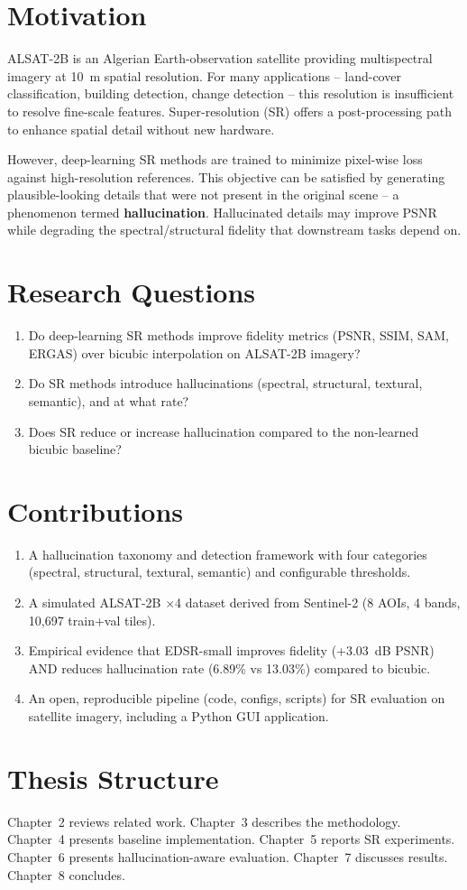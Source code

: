 \section{Motivation}
ALSAT-2B is an Algerian Earth-observation satellite providing multispectral imagery at 10~m spatial resolution. For many applications -- land-cover classification, building detection, change detection -- this resolution is insufficient to resolve fine-scale features. Super-resolution (SR) offers a post-processing path to enhance spatial detail without new hardware.

However, deep-learning SR methods are trained to minimize pixel-wise loss against high-resolution references. This objective can be satisfied by generating plausible-looking details that were not present in the original scene -- a phenomenon termed \textbf{hallucination}. Hallucinated details may improve PSNR while degrading the spectral/structural fidelity that downstream tasks depend on.

\section{Research Questions}
\begin{enumerate}
    \item[RQ1.] Do deep-learning SR methods improve fidelity metrics (PSNR, SSIM, SAM, ERGAS) over bicubic interpolation on ALSAT-2B imagery?
    \item[RQ2.] Do SR methods introduce hallucinations (spectral, structural, textural, semantic), and at what rate?
    \item[RQ3.] Does SR reduce or increase hallucination compared to the non-learned bicubic baseline?
\end{enumerate}

\section{Contributions}
\begin{enumerate}
    \item A hallucination taxonomy and detection framework with four categories (spectral, structural, textural, semantic) and configurable thresholds.
    \item A simulated ALSAT-2B $\times$4 dataset derived from Sentinel-2 (8 AOIs, 4 bands, 10{,}697 train+val tiles).
    \item Empirical evidence that EDSR-small improves fidelity (+3.03~dB PSNR) AND reduces hallucination rate (6.89\% vs 13.03\%) compared to bicubic.
    \item An open, reproducible pipeline (code, configs, scripts) for SR evaluation on satellite imagery, including a Python GUI application.
\end{enumerate}

\section{Thesis Structure}
Chapter~2 reviews related work. Chapter~3 describes the methodology. Chapter~4 presents baseline implementation. Chapter~5 reports SR experiments. Chapter~6 presents hallucination-aware evaluation. Chapter~7 discusses results. Chapter~8 concludes.
